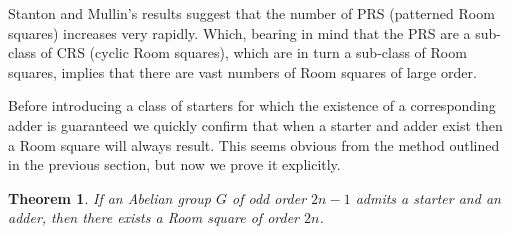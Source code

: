 \documentclass[
  11pt,
  a4paper]{book}
\newtheorem{theorem}{Theorem}
\begin{document}
Stanton and Mullin's results suggest that the number of PRS (patterned
Room squares) increases very rapidly. Which, bearing in mind that the
PRS are a sub-class of CRS (cyclic Room squares), which are in turn a
sub-class of Room squares, implies that there are vast numbers of Room
squares of large order.

Before introducing a class of starters for which the existence of a
corresponding adder is guaranteed we quickly confirm that when a starter
and adder exist then a Room square will always result. This seems
obvious from the method outlined in the previous section, but now we
prove it explicitly.

\begin{theorem}
\label{thm:starter-adder}
If an Abelian group $G$ of odd order $2n - 1$ admits a starter
and an adder, then there exists a Room square of order $2n$.
\end{theorem}
\end{document}
